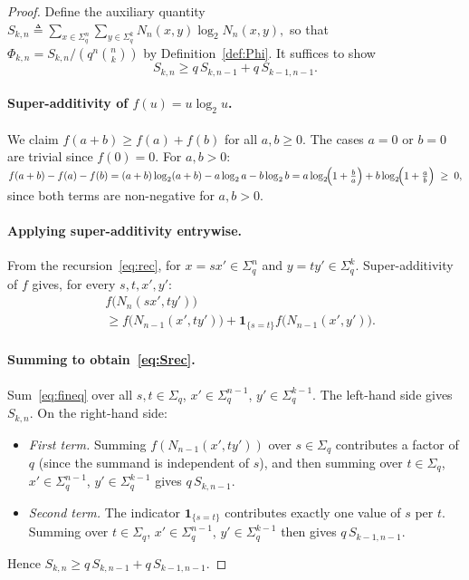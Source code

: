 \documentclass[10pt,a4paper]{amsart}
\begin{document}
\begin{proof}
Define the auxiliary quantity
\(
  S_{k,n}\triangleq\sum_{x\in\Sigma_q^n}\sum_{y\in\Sigma_q^k}
  N_n(x,y)\log_2 N_n(x,y),
\)
so that $\Phi_{k,n}=S_{k,n}/(q^n\binom{n}{k})$ by
Definition~\ref{def:Phi}.  It suffices to show
\begin{equation}
  S_{k,n}\ge q\,S_{k,n-1}+q\,S_{k-1,n-1}.
  \label{eq:Srec}
\end{equation}

\paragraph{Super-additivity of $f(u)=u\log_2 u$.}
We claim $f(a+b)\ge f(a)+f(b)$ for all $a,b\ge 0$.  The cases
$a=0$ or $b=0$ are trivial since $f(0)=0$.  For $a,b>0$:
\(
  f(a+b)-f(a)-f(b)
  =(a+b)\log_2(a+b)-a\log_2 a-b\log_2 b
  =a\log_2\!\Bigl(1+\frac{b}{a}\Bigr)
   +b\log_2\!\Bigl(1+\frac{a}{b}\Bigr)\;\ge\;0,
\)
since both terms are non-negative for $a,b>0$.

\paragraph{Applying super-additivity entrywise.}
From the recursion~\eqref{eq:rec},
for $x=sx'\in\Sigma_q^n$ and $y=ty'\in\Sigma_q^k$.
Super-additivity of $f$ gives, for every $s,t,x',y'$:
\begin{align}
  &f\bigl(N_n(sx',ty')\bigr) \nonumber\\
  &\ge f\bigl(N_{n-1}(x',ty')\bigr)
   +\mathbf{1}_{\{s=t\}}f\bigl(N_{n-1}(x',y')\bigr).
  \label{eq:fineq}
\end{align}

\paragraph{Summing to obtain~\eqref{eq:Srec}.}
Sum~\eqref{eq:fineq} over all $s,t\in\Sigma_q$,
$x'\in\Sigma_q^{n-1}$, $y'\in\Sigma_q^{k-1}$.  The left-hand side
gives $S_{k,n}$.  On the right-hand side:
\begin{itemize}
  \item \emph{First term.} Summing $f(N_{n-1}(x',ty'))$ over
        $s\in\Sigma_q$ contributes a factor of $q$ (since the summand
        is independent of $s$), and then summing over $t\in\Sigma_q$,
        $x'\in\Sigma_q^{n-1}$, $y'\in\Sigma_q^{k-1}$ gives
        $q\,S_{k,n-1}$.
  \item \emph{Second term.} The indicator $\mathbf{1}_{\{s=t\}}$
        contributes exactly one value of $s$ per $t$.  Summing over
        $t\in\Sigma_q$, $x'\in\Sigma_q^{n-1}$, $y'\in\Sigma_q^{k-1}$
        then gives $q\,S_{k-1,n-1}$.
\end{itemize}
Hence $S_{k,n}\ge q\,S_{k,n-1}+q\,S_{k-1,n-1}$.


\end{proof}
\end{document}
